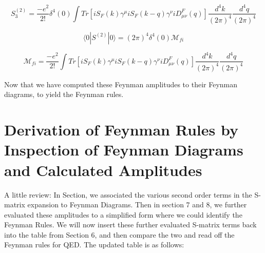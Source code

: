 \documentclass[a4]{article}
\begin{document}
\begin{framed}
            \begin{equation}
                S^{(2)}_3 = \frac{- e^2}{2!} \delta^{4} (0) \int Tr [i S_{F} (k) \gamma^{\mu} i S_{F} (k - q) \gamma^{\nu} i D_{\mu \nu}^{F} (q)] \frac{d^4 k}{(2 \pi)^4} \frac{d^4 q}{(2 \pi)^4}
            \end{equation}

        \end{framed}

        \begin{framed}

            \begin{equation}
                \langle 0 | S^{(2)} | 0 \rangle = (2 \pi)^4 \delta^{4} (0) \mathcal{M}_{fi}
            \end{equation}

            \begin{equation}
                \mathcal{M}_{fi} = \frac{- e^2}{2!} \int Tr [i S_{F} (k) \gamma^{\mu} i S_{F} (k - q) \gamma^{\nu} i D_{\mu \nu}^{F} (q)] \frac{d^4 k}{(2 \pi)^4} \frac{d^4 q}{(2 \pi)^4}
            \end{equation}
        \end{framed}

        Now that we have computed these Feynman amplitudes to their Feynman diagrams, to yield the Feynman rules.

    \section{Derivation of Feynman Rules by Inspection of Feynman Diagrams and Calculated Amplitudes}

    A little review: In Section, we associated the various second order terms in the S-matrix expansion to Feynman
    Diagrams. Then in section 7 and 8, we further evaluated these amplitudes to a simplified form where we could
    identify the Feynman Rules. We will now insert these further evaluated S-matrix terms back into the table from
    Section 6, and then compare the two and read off the Feynman rules for QED. The updated table is as follows:

    \hspace{0.25cm}
\end{document}
